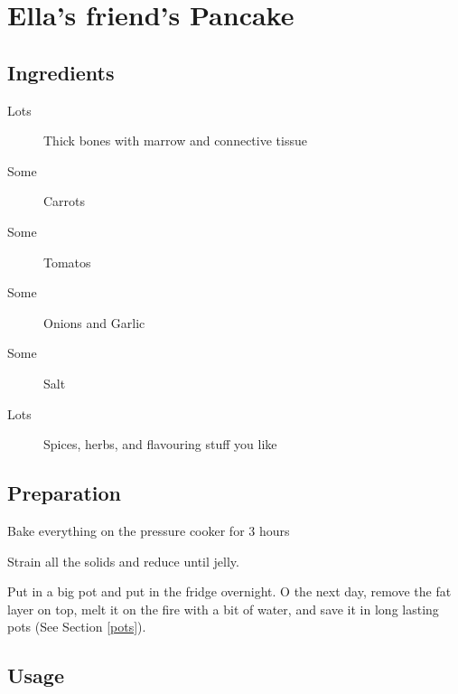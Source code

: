 \setchapterpreamble[u]{\margintoc}
\chapter{Ella's friend's Pancake}\label{pancake}

\section{Ingredients}

\begin{multicols}{2}
	\begin{description}
		\item[Lots] Thick bones with marrow and connective tissue 
		\item[Some] Carrots
		\item[Some] Tomatos
		\item[Some] Onions and Garlic
		\item[Some] Salt
		\item[Lots] Spices, herbs, and flavouring stuff you like
	\end{description}
\end{multicols}	

\section{Preparation}
Bake everything on the pressure cooker for $3$ hours

Strain all the solids and reduce until jelly.

Put in a big pot and put in the fridge overnight. O the next day, remove the fat layer on top, melt it on the fire with a bit of water, and save it in long lasting pots (See Section \ref{pots}).
\section{Usage}

